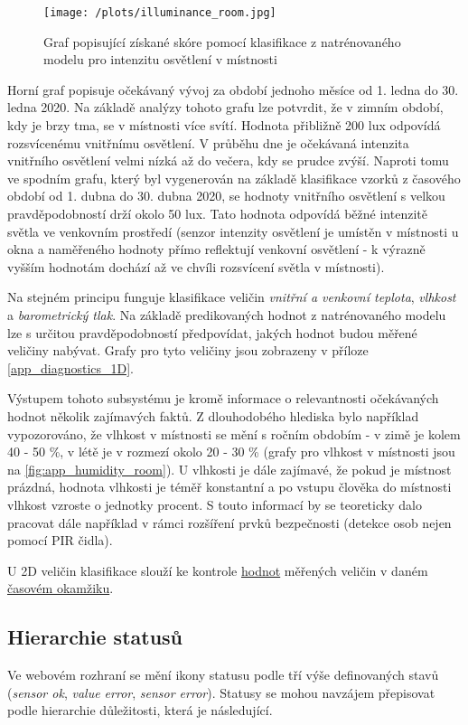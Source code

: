 \begin{figure}[H]
  \centering
  \texttt{[image: /plots/illuminance\_room.jpg]}
  \caption{Graf popisující získané skóre pomocí klasifikace z natrénovaného modelu pro intenzitu osvětlení v místnosti}
  \label{fig:2D_illuminance_room}
\end{figure}

Horní graf popisuje očekávaný vývoj za období jednoho měsíce od 1. ledna do 30. ledna 2020. Na základě analýzy tohoto grafu lze potvrdit, že v zimním období, kdy je brzy tma, se v místnosti více svítí. Hodnota přibližně 200 lux odpovídá rozsvícenému vnitřnímu osvětlení. V průběhu dne je očekávaná intenzita vnitřního osvětlení velmi nízká až do večera, kdy se prudce zvýší. Naproti tomu ve spodním grafu, který byl vygenerován na základě klasifikace vzorků z časového období od 1. dubna do 30. dubna 2020, se hodnoty vnitřního osvětlení s velkou pravděpodobností drží okolo 50 lux. Tato hodnota odpovídá běžné intenzitě světla ve venkovním prostředí (senzor intenzity osvětlení je umístěn v místnosti u okna a naměřeného hodnoty přímo reflektují venkovní osvětlení - k výrazně vyšším hodnotám dochází až ve chvíli rozsvícení světla v místnosti). \par
Na stejném principu funguje klasifikace veličin \textit{vnitřní a venkovní teplota}, \textit{vlhkost} a \textit{barometrický tlak}. Na základě predikovaných hodnot z natrénovaného modelu lze s určitou pravděpodobností předpovídat, jakých hodnot budou měřené veličiny nabývat. Grafy pro tyto veličiny jsou zobrazeny v příloze  \ref{app_diagnostics_1D}. \par
Výstupem tohoto subsystému je kromě informace o relevantnosti očekávaných hodnot několik zajímavých faktů. Z dlouhodobého hlediska bylo například vypozorováno, že vlhkost v místnosti se mění s ročním obdobím - v zimě je kolem 40 - 50 \%, v létě je v rozmezí okolo 20 - 30 \% (grafy pro vlhkost v místnosti jsou na \cref{fig:app_humidity_room}). U vlhkosti je dále zajímavé, že pokud je místnost prázdná, hodnota vlhkosti je téměř konstantní a po vstupu člověka do místnosti vlhkost vzroste o jednotky procent. S touto informací by se teoreticky dalo pracovat dále například v rámci rozšíření prvků bezpečnosti (detekce osob nejen pomocí PIR čidla). \par
U 2D veličin klasifikace slouží ke kontrole \underline{hodnot} měřených veličin v daném \underline{časovém okamžiku}. 

\subsection*{Hierarchie statusů}
Ve webovém rozhraní se mění ikony statusu podle tří výše definovaných stavů (\textit{sensor ok}, \textit{value error}, \textit{sensor error}). Statusy se mohou navzájem přepisovat podle hierarchie důležitosti, která je následující.  \par

